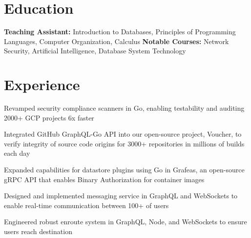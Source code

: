 \documentclass[]{deedy-resume}
\begin{document}
%
%



\section{Education}

\textbf{Teaching Assistant:} Introduction to Databases, Principles of Programming Languages, Computer Organization, Calculus
\newline
\textbf{Notable Courses:} Network Security, Artificial Intelligence, Database System Technology
\sectionsep

\section{Experience}

\begin{tightemize}
\item Revamped security compliance scanners in Go, enabling testability and auditing 2000+ GCP projects 6x faster
\item Integrated GitHub GraphQL-Go API into our open-source project, Voucher, to verify integrity of source code origins for 3000+ repositories in millions of builds each day
\item Expanded capabilities for datastore plugins using Go in Grafeas, an open-source gRPC API that enables Binary Authorization for container images
\end{tightemize}
\sectionsep

\begin{tightemize}
\item Designed and implemented messaging service in GraphQL and WebSockets to enable real-time communication between 100+ of users
\item Engineered robust enroute system in GraphQL, Node, and WebSockets to ensure users reach destination
\end{tightemize}
\sectionsep
\end{document}
